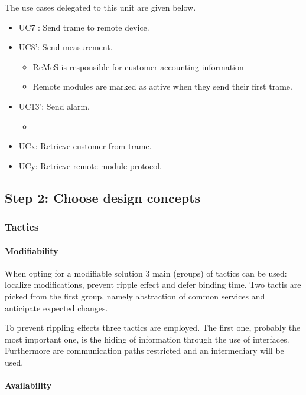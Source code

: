 \npar The use cases delegated to this unit are given below.

\begin{itemize}
	\item UC7 : Send trame to remote device.
	\item UC8': Send measurement.
	\begin{itemize}
    	\item ReMeS is responsible for customer accounting information
    	\item Remote modules are marked as active when they send their first
    	trame.
  	\end{itemize}
  	\item UC13': Send alarm.
  	\begin{itemize}
		\item %
  	\end{itemize}
  	\item UCx: Retrieve customer from trame.
  	\item UCy: Retrieve remote module protocol.
\end{itemize}

\subsection{Step 2: Choose design concepts}
\label{add:it2/concepts}

\subsubsection{Tactics}
\label{add:it2/tactics}

\paragraph{Modifiability}

\npar When opting for a modifiable solution 3 main (groups) of tactics can be
used: localize modifications, prevent ripple effect and defer binding time.
Two tactis are picked from the first group, namely abstraction of common
services and anticipate expected changes.

\npar To prevent rippling effects three tactics are employed. The first one,
probably the most important one, is the hiding of information through the use of
interfaces. Furthermore are communication paths restricted and an intermediary
will be used.

\paragraph{Availability}

